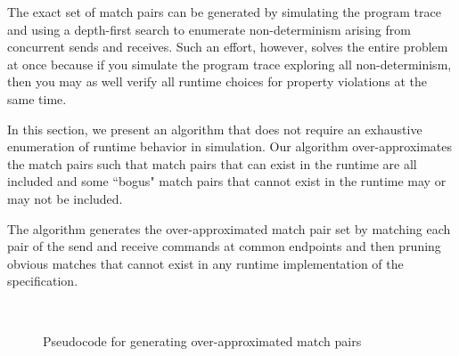 The exact set of match pairs can be generated by simulating the
program trace and using a depth-first search to enumerate
non-determinism arising from concurrent sends and receives. Such an
effort, however, solves the entire problem at once because if you
simulate the program trace exploring all non-determinism, then you may
as well verify all runtime choices for property violations at the same
time. 

In this section, we present an algorithm that does not require
an exhaustive enumeration of runtime behavior in simulation. Our
algorithm over-approximates the match pairs such that match pairs that
can exist in the runtime are all included and some ``bogus" match
pairs that cannot exist in the runtime may or may not be included.


The algorithm generates the over-approximated match pair set by
matching each pair of the send and receive commands at common
endpoints and then pruning obvious matches that cannot exist in any
runtime implementation of the specification.

\begin{figure}[h]
\setlength{\tabcolsep}{20pt}
\begin{center}
\scalebox{0.7}{\usebox{\boxalgorithm}}\\
\end{center}
\caption{Pseudocode for generating over-approximated match pairs}
\label{fig:pseudocode}
\end{figure}

